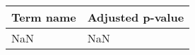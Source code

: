 \begin{tabular}{ll}
\toprule
Term name & Adjusted p-value \\
\midrule
      NaN &              NaN \\
\bottomrule
\end{tabular}
